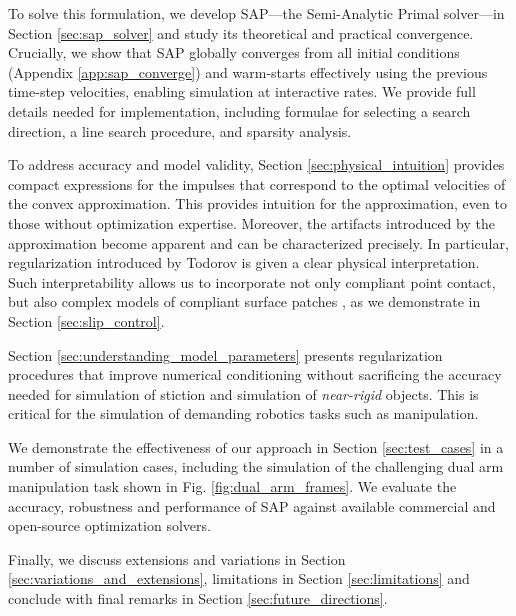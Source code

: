 To solve this formulation, we develop SAP---the Semi-Analytic Primal solver---in
Section \ref{sec:sap_solver} and study its theoretical and practical
convergence.  Crucially, we show that SAP globally converges from all initial
conditions (Appendix \ref{app:sap_converge}) and warm-starts effectively using
the previous time-step velocities, enabling simulation at interactive rates. We
provide full details needed for implementation, including formulae for selecting
a search direction, a line search procedure, and sparsity analysis. 

To address accuracy and model validity,
Section \ref{sec:physical_intuition} provides compact expressions for the
impulses that correspond to the optimal velocities of the convex approximation.
This provides intuition for the approximation, even to those without
optimization expertise. Moreover, the artifacts introduced by the approximation
become apparent and can be characterized precisely. In particular,
regularization introduced by Todorov \cite{bib:todorov2014} is given a clear
physical interpretation. Such interpretability  allows us to incorporate not
only compliant point contact, but also complex models of compliant surface
patches \cite{bib:elandt2019pressure}, as we demonstrate in Section
\ref{sec:slip_control}. 

Section \ref{sec:understanding_model_parameters} presents regularization
procedures that improve numerical conditioning without sacrificing the accuracy
needed for simulation of stiction and simulation of \emph{near-rigid} objects.
This is critical for the simulation of demanding robotics tasks such as
manipulation. 

We demonstrate the effectiveness of our approach in Section \ref{sec:test_cases}
in a number of simulation cases, including the simulation of the challenging
dual arm manipulation task shown in Fig. \ref{fig:dual_arm_frames}. We evaluate
the accuracy, robustness and performance of SAP against available commercial and
open-source optimization solvers.

Finally, we discuss extensions and variations in Section
\ref{sec:variations_and_extensions}, limitations in Section
\ref{sec:limitations} and conclude with final remarks in Section
\ref{sec:future_directions}.
